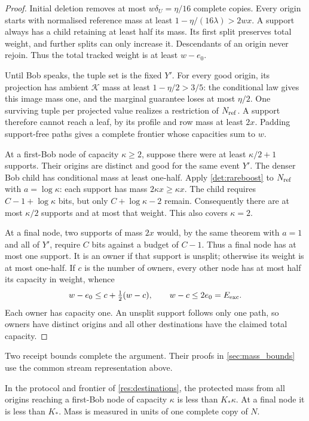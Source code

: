 \documentclass[11pt]{article} \usepackage[utf8]{inputenc}
\theoremstyle{plain} \newtheorem{theorem}{Theorem}[section]
\theoremstyle{definition} \newaliascnt{definition}{theorem}
\begin{document}
\begin{proof}
Initial deletion removes at most $w\delta_U=\eta/16$ complete copies.
Every origin starts with normalised reference mass at least
$1-\eta/(16\lambda)>2wx$. A support always has a child retaining at
least half its mass. Its first split preserves total weight, and further
splits can only increase it. Descendants of an origin never rejoin.
Thus the total tracked weight is at least $w-e_0$.

Until Bob speaks, the tuple set is the fixed $Y'$. For every good origin,
its projection has ambient $\mathcal K$ mass at least $1-\eta/2>3/5$:
the conditional law gives this image mass one, and the marginal guarantee
loses at most $\eta/2$. One surviving tuple per projected value realizes
a restriction of $N_{\rm ref}$. A support therefore cannot reach a leaf,
by its profile and row mass at least $2x$. Padding support-free paths
gives a complete frontier whose capacities sum to $w$.

At a first-Bob node of capacity $\kappa\ge2$, suppose there were at least
$\kappa/2+1$ supports. Their origins are distinct and good for the same
event $Y'$. The denser Bob child has conditional mass at least one-half.
Apply \cref{det:rareboost} to $N_{\rm ref}$ with $a=\log\kappa$:
each support has mass $2\kappa x\ge\kappa x$. The child requires
$C-1+\log\kappa$ bits, but only $C+\log\kappa-2$ remain.
Consequently there are at most $\kappa/2$ supports and at most that weight.
This also covers $\kappa=2$.

At a final node, two supports of mass $2x$ would, by the same theorem
with $a=1$ and all of $Y'$, require $C$ bits against a budget of $C-1$.
Thus a final node has at most one support. It is an owner if that support
is unsplit; otherwise its weight is at most one-half. If $c$ is the
number of owners, every other node has at most half its capacity in
weight, whence
\[
 w-e_0\le c+\tfrac12(w-c),\qquad w-c\le2e_0=E_{\rm exc}.
\]
Each owner has capacity one. An unsplit support follows only one path,
so owners have distinct origins and all other destinations have the
claimed total capacity.
\end{proof}

Two receipt bounds complete the argument. Their proofs in
\cref{sec:mass_bounds} use the common stream representation above.

\begin{lemma}\label{res:incoming}
In the protocol and frontier of \cref{res:destinations}, the protected
mass from all origins reaching a first-Bob node of capacity $\kappa$ is
less than $K_*\kappa$. At a final node it is less than $K_*$.
Mass is measured in units of one complete copy of $N$.
\end{lemma}
\end{document}
